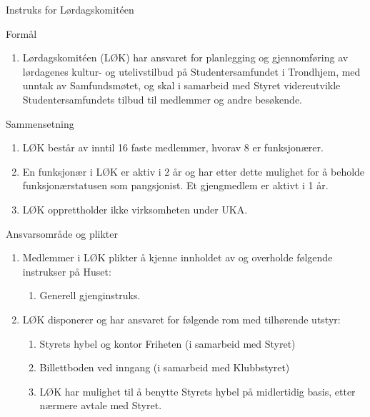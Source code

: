 \begin{instruks*}{Instruks for Lørdagskomit\'een}

    \begin{instruksledd}{Formål}
        \begin{enumerate}
            \item Lørdagskomit\'een (LØK) har ansvaret for planlegging og gjennomføring av lørdagenes
                kultur- og
                utelivstilbud på Studentersamfundet i Trondhjem, med unntak av Samfundsmøtet, og skal i samarbeid
                med
                Styret videreutvikle Studentersamfundets tilbud til medlemmer og andre besøkende.
        \end{enumerate}
    \end{instruksledd}

    \begin{instruksledd}{Sammensetning}
        \begin{enumerate}
            \item LØK består av inntil 16 faste medlemmer, hvorav 8 er funksjonærer.
            \item En funksjonær i LØK er aktiv i 2 år og har etter dette mulighet for å beholde
                funksjonærstatusen som
                pangsjonist. Et gjengmedlem er aktivt i 1 år.
            \item LØK opprettholder ikke virksomheten under UKA.
        \end{enumerate}
    \end{instruksledd}

    \begin{instruksledd}{Ansvarsområde og plikter}
        \begin{enumerate}
            \item  Medlemmer i LØK plikter å kjenne innholdet av og overholde følgende instrukser på
                Huset:
                \begin{enumerate}
                    \item Generell gjenginstruks.
                \end{enumerate}
            \item LØK disponerer og har ansvaret for følgende rom med tilhørende utstyr:
                \begin{enumerate}
                    \item Styrets hybel og kontor Friheten (i samarbeid med Styret)
                    \item Billettboden ved inngang (i samarbeid med Klubbstyret)
                    \item LØK har mulighet til å benytte Styrets hybel på midlertidig basis, etter
                        nærmere avtale med Styret.
                \end{enumerate}
        \end{enumerate}
    \end{instruksledd}


\end{instruks*}
